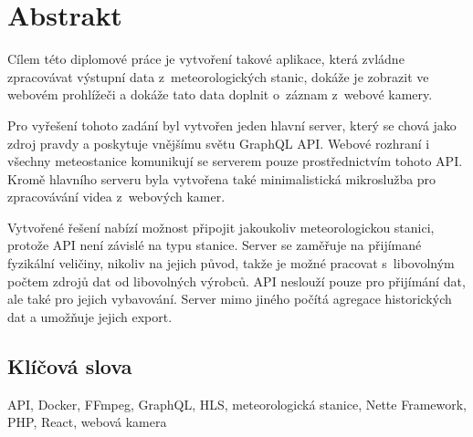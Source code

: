 
\chapter*{Abstrakt}
Cílem této diplomové práce je vytvoření takové aplikace, která zvládne zpracovávat výstupní data z~meteorologických stanic, dokáže je zobrazit ve we\-bo\-vém prohlížeči a dokáže tato data doplnit o~záznam z~webové kamery.

Pro vyřešení tohoto zadání byl vytvořen jeden hlavní server, který se chová jako zdroj pravdy a poskytuje vnějšímu světu GraphQL API. Webové rozhraní i všechny meteostanice komunikují se serverem pouze pro\-střed\-nic\-tvím tohoto API. Kromě hlavního serveru byla vytvořena také minimalistická mikroslužba pro zpracovávání videa z~webových kamer.

Vytvořené řešení nabízí možnost připojit jakoukoliv meteorologickou stanici, protože API není závislé na typu stanice. Server se zaměřuje na při\-jí\-ma\-né fyzikální veličiny, nikoliv na jejich původ, takže je možné pracovat s~libovolným počtem zdrojů dat od libovolných výrobců. API neslouží pouze pro přijímání dat, ale také pro jejich vybavování. Server mimo jiného počítá agregace historických dat a umožňuje jejich export.

\vfill

\section*{Klíčová slova}
API, Docker, FFmpeg, GraphQL, HLS, meteorologická stanice, Nette Framework, PHP, React, webová kamera
